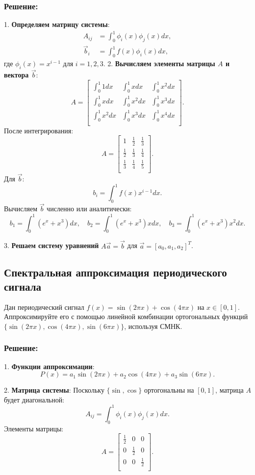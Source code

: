\subsubsection*{Решение:}
1. \textbf{Определяем матрицу системы}:
\begin{align*}
A_{ij} &= \int_0^1 \phi_i(x) \phi_j(x) dx, \\
\vec{b}_i &= \int_0^1 f(x) \phi_i(x) dx,
\end{align*}
где $\phi_i(x) = x^{i-1}$ для $i = 1, 2, 3$.
2. \textbf{Вычисляем элементы матрицы $A$ и вектора $\vec{b}$}:
\[
A = \begin{bmatrix}
\int_0^1 1 dx & \int_0^1 x dx & \int_0^1 x^2 dx \\
\int_0^1 x dx & \int_0^1 x^2 dx & \int_0^1 x^3 dx \\
\int_0^1 x^2 dx & \int_0^1 x^3 dx & \int_0^1 x^4 dx \\
\end{bmatrix}.
\]
После интегрирования:
\[
A = \begin{bmatrix}
1 & \frac{1}{2} & \frac{1}{3} \\
\frac{1}{2} & \frac{1}{3} & \frac{1}{4} \\
\frac{1}{3} & \frac{1}{4} & \frac{1}{5} \\
\end{bmatrix}.
\]
Для $\vec{b}$:
\[
b_i = \int_0^1 f(x) x^{i-1} dx.
\]
Вычисляем $\vec{b}$ численно или аналитически:
\[
b_1 = \int_0^1 (e^x + x^3) dx, \quad b_2 = \int_0^1 (e^x + x^3)x dx, \quad b_3 = \int_0^1 (e^x + x^3)x^2 dx.
\]

3. \textbf{Решаем систему уравнений} $A \vec{a} = \vec{b}$ для $\vec{a} = [a_0, a_1, a_2]^T$.

\subsection{Спектральная аппроксимация периодического сигнала}
Дан периодический сигнал $f(x) = \sin(2\pi x) + \cos(4\pi x)$ на $x \in [0, 1]$. Аппроксимируйте его с помощью линейной комбинации ортогональных функций $\{\sin(2\pi x), \cos(4\pi x), \sin(6\pi x)\}$, используя СМНК.

\subsubsection*{Решение:}
1. \textbf{Функции аппроксимации}:
\[
P(x) = a_1 \sin(2\pi x) + a_2 \cos(4\pi x) + a_3 \sin(6\pi x).
\]

2. \textbf{Матрица системы}:
Поскольку $\{\sin, \cos\}$ ортогональны на $[0, 1]$, матрица $A$ будет диагональной:
\[
A_{ij} = \int_0^1 \phi_i(x) \phi_j(x) dx.
\]
Элементы матрицы:
\[
A = \begin{bmatrix}
\frac{1}{2} & 0 & 0 \\
0 & \frac{1}{2} & 0 \\
0 & 0 & \frac{1}{2} \\
\end{bmatrix}.
\]

